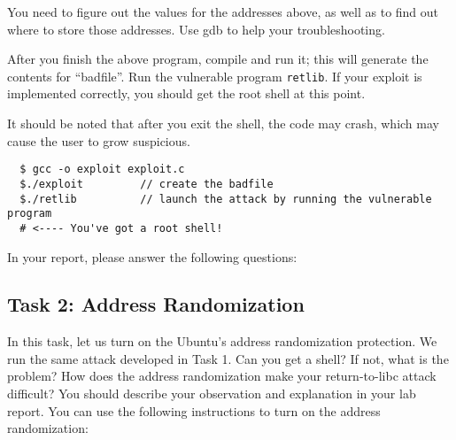 You need to figure out the values for the addresses above, as well as to
find out where to store those addresses. Use gdb to help your troubleshooting.

After you finish the above program, compile and run it; this will
generate the contents for ``badfile''. Run the vulnerable program {\tt retlib}. If your exploit is implemented correctly, you should get the root shell at this point.


It should be noted that after you exit the shell, the code may crash, which may cause the user to grow suspicious.\\  

\begin{verbatim}
  $ gcc -o exploit exploit.c
  $./exploit         // create the badfile
  $./retlib          // launch the attack by running the vulnerable program
  # <---- You've got a root shell! 
\end{verbatim}


In your report, please answer the following questions:\\




\subsection{Task 2: Address Randomization}

In this task, let us turn on the Ubuntu's address randomization protection.  
We run the same attack developed in Task 1. Can you get a shell? If not, 
what is the problem? How does the address randomization
make your return-to-libc attack difficult?
You should describe your observation and explanation
in your lab report. You can use the following instructions to turn
on the address randomization:

